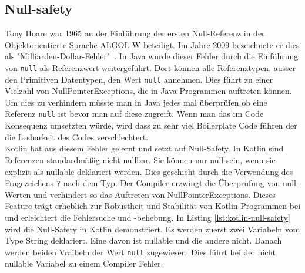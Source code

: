 \documentclass[11pt]{article}
\begin{document}
    \subsection{Null-safety}
    Tony Hoare war 1965 an der Einführung der ersten Null-Referenz in der Objektorientierte Sprache ALGOL W beteiligt.
    Im Jahre 2009 bezeichnete er dies als "Milliarden-Dollar-Fehler"~\cite{billion-dollar-mistake}.
    In Java wurde dieser Fehler durch die Einführung von \texttt{null} als Referenzwert weitergeführt.
    Dort können alle Referenztypen, ausser den Primitiven Datentypen, den Wert \texttt{null} annehmen.
    Dies führt zu einer Vielzahl von NullPointerExceptions, die in Java-Programmen auftreten können.
    Um dies zu verhindern müsste man in Java jedes mal überprüfen ob eine Referenz \texttt{null} ist bevor man auf diese zugreift.
    Wenn man das im Code Konsequenz umsetzten würde, wird dass zu sehr viel Boilerplate Code führen der die Lesbarkeit des Codes verschlechtert.\\
    Kotlin hat aus diesem Fehler gelernt und setzt auf Null-Safety.
    In Kotlin sind Referenzen standardmäßig nicht nullbar.
    Sie können nur null sein, wenn sie explizit als nullable deklariert werden.
    Dies geschieht durch die Verwendung des Fragezeichens \texttt{?} nach dem Typ.
    Der Compiler erzwingt die Überprüfung von null-Werten und verhindert so das Auftreten von NullPointerExceptions.
    Dieses Feature trägt erheblich zur Robustheit und Stabilität von Kotlin-Programmen bei und erleichtert die Fehlersuche und -behebung.
    In Listing \ref{lst:kotlin-null-safety} wird die Null-Safety in Kotlin demonstriert.
    Es werden zuerst zwei Variabeln vom Type String deklariert.
    Eine davon ist nullable und die andere nicht.
    Danach werden beiden Vraibeln der Wert \texttt{null} zugewiesen.
    Dies führt bei der nicht nullable Variabel zu einem Compiler Fehler. \\
\end{document}
